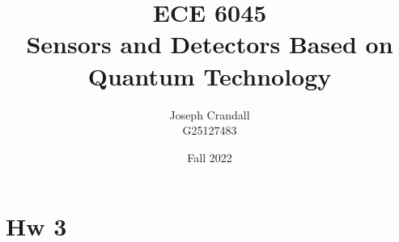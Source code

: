 
\usepackage{algorithm, algpseudocode, bm, color, gensymb, listings, siunitx, soul, subfiles, verbatim}
\usepackage[a4paper, total={7.5in, 10in}]{geometry}

\title{ECE 6045 \\ Sensors and Detectors Based on Quantum Technology}
\author{Joseph Crandall \\ G25127483}
\date{Fall 2022}


\maketitle

\begin{comment}

\section{Hw 1}


\section{HW 2}


\end{comment}

\section{Hw 3}


\begin{comment}

\section{Lecture 3}


\end{comment}


